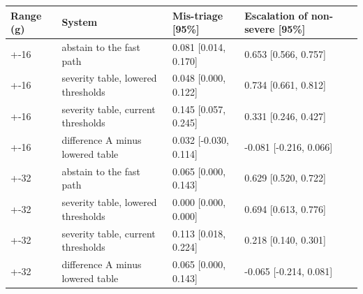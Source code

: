 \begin{tabular}{llll}
\toprule
Range (g) & System & Mis-triage [95\%] & Escalation of non-severe [95\%] \\
\midrule
+-16 & abstain to the fast path & 0.081 [0.014, 0.170] & 0.653 [0.566, 0.757] \\
+-16 & severity table, lowered thresholds & 0.048 [0.000, 0.122] & 0.734 [0.661, 0.812] \\
+-16 & severity table, current thresholds & 0.145 [0.057, 0.245] & 0.331 [0.246, 0.427] \\
+-16 & difference A minus lowered table & 0.032 [-0.030, 0.114] & -0.081 [-0.216, 0.066] \\
+-32 & abstain to the fast path & 0.065 [0.000, 0.143] & 0.629 [0.520, 0.722] \\
+-32 & severity table, lowered thresholds & 0.000 [0.000, 0.000] & 0.694 [0.613, 0.776] \\
+-32 & severity table, current thresholds & 0.113 [0.018, 0.224] & 0.218 [0.140, 0.301] \\
+-32 & difference A minus lowered table & 0.065 [0.000, 0.143] & -0.065 [-0.214, 0.081] \\
\bottomrule
\end{tabular}
